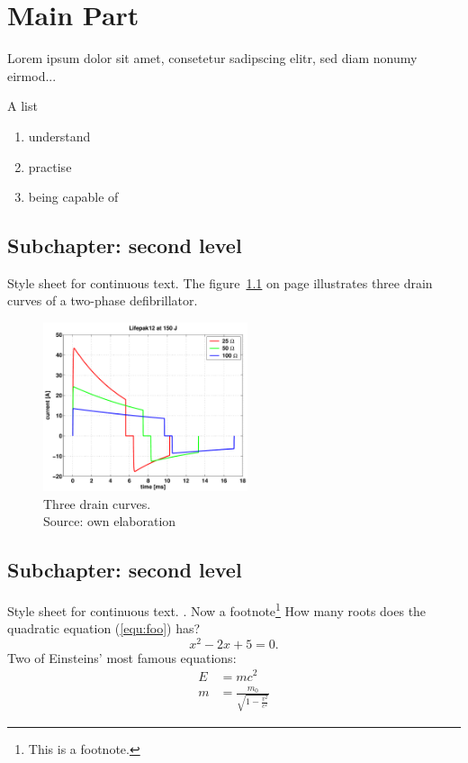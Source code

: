 \chapter{Main Part}
Lorem ipsum dolor sit amet, consetetur sadipscing elitr, sed diam nonumy
eirmod...

A list
\begin{enumerate}
 \item understand
 \item practise
 \item being capable of
\end{enumerate}


\section{Subchapter: second level}

Style sheet for continuous text. The figure~\ref{fig:ex} on page \pageref{fig:ex}
illustrates three drain curves of a two-phase defibrillator.

\begin{figure}[htb]
  \centering
  \includegraphics[width=6cm]{content/image/defi}
  \caption[Drain curve of a two-phase defibrillator]{Three drain curves. \\Source: own elaboration}
 \label{fig:ex}
\end{figure}


\section{Subchapter: second level}
Style sheet for continuous text. .
Now a footnote\footnote{This is a footnote.}
How many roots does the quadratic equation (\ref{equ:foo}) has?
\begin{equation}
 \label{equ:foo}
 x^2-2x+5=0.
\end{equation}
Two of Einsteins' most famous equations:
\begin{eqnarray*}
  E &= mc^2                                  \\
  m &= \frac{m_0}{\sqrt{1-\frac{v^2}{c^2}}}
\end{eqnarray*}


